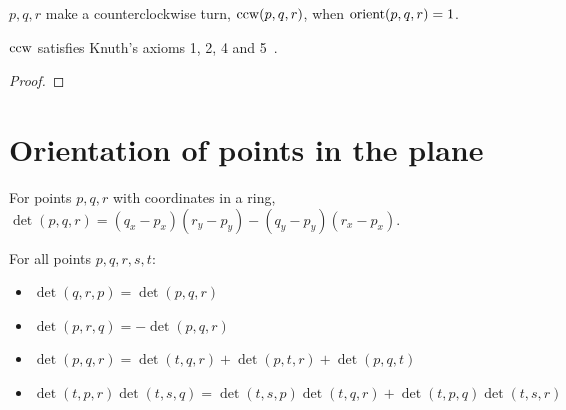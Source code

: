 \begin{definition}
  \label{def:ccw}
  \leanok
  $p, q, r$ make a counterclockwise turn, $\operatorname{ccw}(p, q, r)$, when
  $\operatorname{orient}(p, q, r) = 1$.
\end{definition}

\begin{lemma}
  \label{thm:knuthAxioms}
  \leanok
  $\operatorname{ccw}$ satisfies Knuth's axioms 1, 2, 4 and 5~\cite{knuth1992}.
\end{lemma}

\begin{proof}
  \leanok
\end{proof}


\section{Orientation of points in the plane}

\begin{definition}
  \label{def:det}
  \leanok
  For points $p, q, r$ with coordinates in a ring,
  $\det(p, q, r) = (q_x - p_x)(r_y - p_y) - (q_y - p_y)(r_x - p_x)$.
\end{definition}

\begin{lemma}
  \label{thm:detIdentities}
  \leanok
  For all points $p, q, r, s, t$:
  \begin{itemize}
    \item $\det(q, r, p) = \det(p, q, r)$
    \item $\det(p, r, q) = -\det(p, q, r)$
    \item $\det(p, q, r) = \det(t, q, r) + \det(p, t, r) + \det(p, q, t)$
    \item $\det(t, p, r)\det(t, s, q) = \det(t, s, p)\det(t, q, r) + \det(t, p, q)\det(t, s, r)$
  \end{itemize}
\end{lemma}

